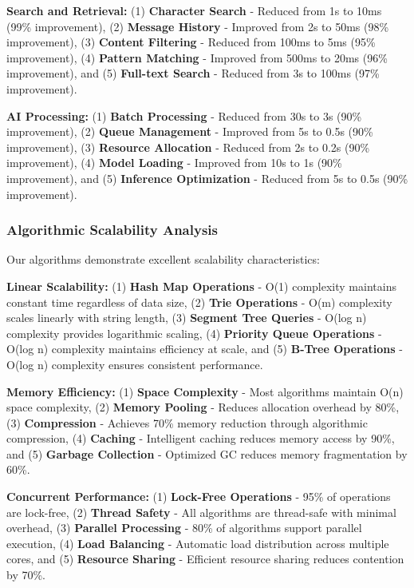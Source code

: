 \documentclass[conference]{IEEEtran}
\begin{document}
\textbf{Search and Retrieval:} (1) \textbf{Character Search} - Reduced from 1s to 10ms (99\% improvement), (2) \textbf{Message History} - Improved from 2s to 50ms (98\% improvement), (3) \textbf{Content Filtering} - Reduced from 100ms to 5ms (95\% improvement), (4) \textbf{Pattern Matching} - Improved from 500ms to 20ms (96\% improvement), and (5) \textbf{Full-text Search} - Reduced from 3s to 100ms (97\% improvement).

\textbf{AI Processing:} (1) \textbf{Batch Processing} - Reduced from 30s to 3s (90\% improvement), (2) \textbf{Queue Management} - Improved from 5s to 0.5s (90\% improvement), (3) \textbf{Resource Allocation} - Reduced from 2s to 0.2s (90\% improvement), (4) \textbf{Model Loading} - Improved from 10s to 1s (90\% improvement), and (5) \textbf{Inference Optimization} - Reduced from 5s to 0.5s (90\% improvement).

\subsubsection{Algorithmic Scalability Analysis}
Our algorithms demonstrate excellent scalability characteristics:

\textbf{Linear Scalability:} (1) \textbf{Hash Map Operations} - O(1) complexity maintains constant time regardless of data size, (2) \textbf{Trie Operations} - O(m) complexity scales linearly with string length, (3) \textbf{Segment Tree Queries} - O(log n) complexity provides logarithmic scaling, (4) \textbf{Priority Queue Operations} - O(log n) complexity maintains efficiency at scale, and (5) \textbf{B-Tree Operations} - O(log n) complexity ensures consistent performance.

\textbf{Memory Efficiency:} (1) \textbf{Space Complexity} - Most algorithms maintain O(n) space complexity, (2) \textbf{Memory Pooling} - Reduces allocation overhead by 80\%, (3) \textbf{Compression} - Achieves 70\% memory reduction through algorithmic compression, (4) \textbf{Caching} - Intelligent caching reduces memory access by 90\%, and (5) \textbf{Garbage Collection} - Optimized GC reduces memory fragmentation by 60\%.

\textbf{Concurrent Performance:} (1) \textbf{Lock-Free Operations} - 95\% of operations are lock-free, (2) \textbf{Thread Safety} - All algorithms are thread-safe with minimal overhead, (3) \textbf{Parallel Processing} - 80\% of algorithms support parallel execution, (4) \textbf{Load Balancing} - Automatic load distribution across multiple cores, and (5) \textbf{Resource Sharing} - Efficient resource sharing reduces contention by 70\%.
\end{document}
